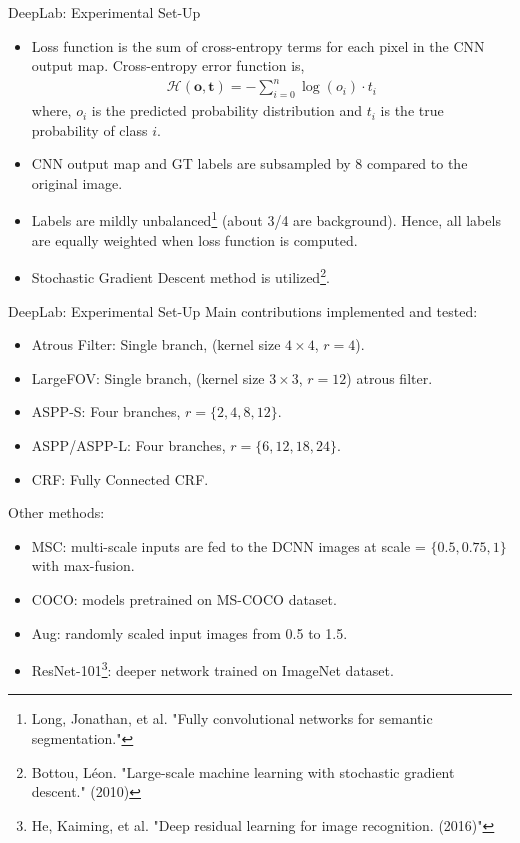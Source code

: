 \documentclass{beamer}
\begin{document}
\begin{frame}{DeepLab: Experimental Set-Up }
\begin{itemize}
	\item Loss function is the sum of cross-entropy terms for each pixel in the CNN output map. Cross-entropy error function is,
	\begin{align*}
	\mathcal{H}(\mathbf{o},\mathbf{t})=-\sum_{i=0}^{n}\log(o_i)\cdot t_i
	\end{align*}
	where, $o_i$ is the predicted probability distribution and $t_i$ is the true probability of class $i$. 
	\item<2-> CNN output map and GT labels are subsampled by 8 compared to the original image.
	\item<3-> Labels are mildly unbalanced\footnote{Long, Jonathan, et al. "Fully convolutional networks for semantic segmentation."} (about 3/4 are background). Hence, all labels are equally weighted when loss function is computed.
	\item<4-> Stochastic Gradient Descent method is utilized\footnote{Bottou, Léon. "Large-scale machine learning with stochastic gradient\\ descent." (2010)}. 
\end{itemize}
\end{frame}

\begin{frame}{DeepLab: Experimental Set-Up }
Main contributions implemented and tested:
\begin{itemize}
	\item {\color{blue}Atrous Filter}: Single branch, (kernel size $4\times4$, $r=4$).	
	\item {\color{blue}LargeFOV}: Single branch, (kernel size $3\times3$, $r=12$) atrous filter.
	\item {\color{blue}ASPP-S}: Four branches, $r= \{2, 4, 8, 12\}$.
	\item {\color{blue}ASPP/ASPP-L}: Four branches, $r = \{6, 12, 18, 24\}$.
	\item {\color{blue}CRF}: Fully Connected CRF.
\end{itemize}
Other methods:
\begin{itemize}
	\item {\color{blue}MSC}: multi-scale inputs are fed to the DCNN images at scale = $\{0.5, 0.75, 1\}$ with max-fusion.
	\item {\color{blue}COCO}: models pretrained on MS-COCO dataset.
	\item {\color{blue}Aug}: randomly scaled input images from 0.5 to 1.5.
	\item {\color{blue}ResNet-101\footnote{He, Kaiming, et al. "Deep residual learning for image recognition. (2016)"}}: deeper network trained on ImageNet dataset. 
\end{itemize}
\end{frame}
\end{document}
